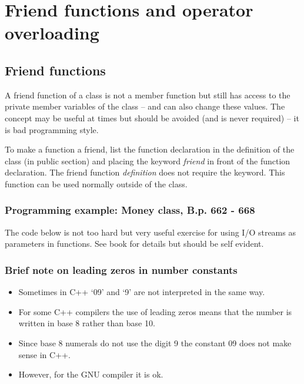 \section{Friend functions and operator overloading}

\subsection{Friend functions}
A friend function of a class is not a member function but still has access to the private member
variables of the class -- and can also change these values. The concept may be useful at times
but should be avoided (and is never required) -- it is bad programming style.

To make a function a friend, list the function declaration in the definition of the class (in public section)
and placing the keyword \emph{friend} in front of the function declaration. The friend function
\emph{definition} does not require the keyword. This function can be used normally outside of the class.



\subsubsection*{Programming example: Money class, B.p. 662 - 668}
The code below is not too hard but very useful exercise for using I/O streams as
parameters in functions. See book for details but should be self evident.


\subsubsection*{Brief note on leading zeros in number constants}
\begin{itemize}
	\item Sometimes in C++ `09' and `9' are not interpreted in the same way.
	\item For some C++ compilers the use of leading zeros means that the number is
	written in base 8 rather than base 10.
	\item Since base 8 numerals do not use the digit 9 the constant 09 does not make
	sense in C++.
	\item However, for the GNU compiler it is ok.
\end{itemize}




